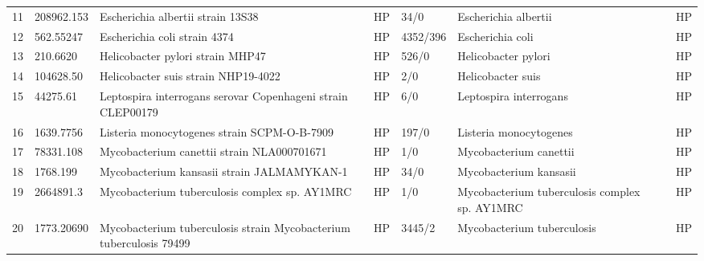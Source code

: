 \begin{longtable}{llllllll}
11  &    208962.153 &                                        Escherichia albertii strain 13S38 &    HP &      34/0 &                           Escherichia albertii &                                          \cite{ooka2013human} &    HP \\
12  &     562.55247 &                                             Escherichia coli strain 4374 &    HP &  4352/396 &                               Escherichia coli &                                   \cite{jesumirhewe2020whole} &    HP \\
13  &      210.6620 &                                         Helicobacter pylori strain MHP47 &    HP &     526/0 &                            Helicobacter pylori &                             \cite{saranathan2020helicobacter} &    HP \\
14  &     104628.50 &                                      Helicobacter suis strain NHP19-4022 &    HP &       2/0 &                              Helicobacter suis &                                 \cite{haesebrouck2009gastric} &    HP \\
15  &      44275.61 &              Leptospira interrogans serovar Copenhageni strain CLEP00179 &    HP &       6/0 &                         Leptospira interrogans &                                      \cite{trindade2020draft} &    HP \\
16  &     1639.7756 &                              Listeria monocytogenes strain SCPM-O-B-7909 &    HP &     197/0 &                         Listeria monocytogenes &                                  \cite{ramaswamy2007listeria} &    HP \\
17  &     78331.108 &                               Mycobacterium canettii strain NLA000701671 &    HP &       1/0 &                         Mycobacterium canettii &                                      \cite{supply2017biology} &    HP \\
18  &      1768.199 &                               Mycobacterium kansasii strain JALMAMYKAN-1 &    HP &      34/0 &                         Mycobacterium kansasii &                                   \cite{jagielski2020genomic} &    HP \\
19  &     2664891.3 &                            Mycobacterium tuberculosis complex sp. AY1MRC &    HP &       1/0 &  Mycobacterium tuberculosis complex sp. AY1MRC &                                   \cite{abdelhaleem2020whole} &    HP \\
20  &    1773.20690 &       Mycobacterium tuberculosis strain Mycobacterium tuberculosis 79499 &    HP &    3445/2 &                     Mycobacterium tuberculosis &                                         \cite{bottai2020tbd1} &    HP \\

\end{longtable}
